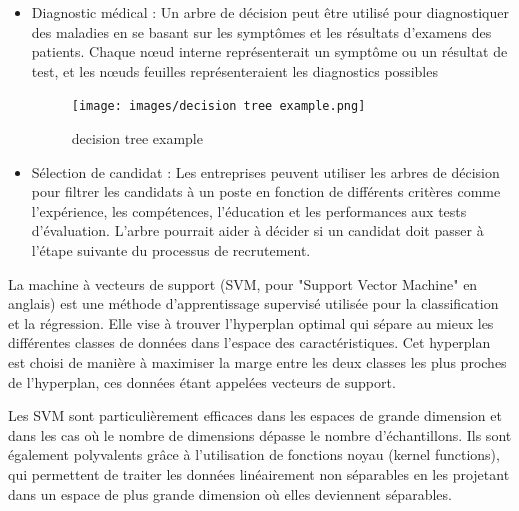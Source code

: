 \documentclass[a4paper,14pt]{article}
\begin{document}

            \begin{itemize}
                \item Diagnostic médical : Un arbre de décision peut être utilisé pour diagnostiquer des maladies en se basant sur les symptômes et les résultats d'examens des patients. Chaque nœud interne représenterait un symptôme ou un résultat de test, et les nœuds feuilles représenteraient les diagnostics possibles

                 \begin{figure}[h]
                    \centering
                    \texttt{[image: images/decision tree example.png]}
                    \caption{decision tree example}
                    \label{fig:decision tree example}
                \end{figure}
                \item Sélection de candidat : Les entreprises peuvent utiliser les arbres de décision pour filtrer les candidats à un poste en fonction de différents critères comme l'expérience, les compétences, l'éducation et les performances aux tests d'évaluation. L'arbre pourrait aider à décider si un candidat doit passer à l'étape suivante du processus de recrutement.
            \end{itemize}
            
        La machine à vecteurs de support (SVM, pour "Support Vector Machine" en anglais) est une méthode d'apprentissage supervisé utilisée pour la classification et la régression. Elle vise à trouver l'hyperplan optimal qui sépare au mieux les différentes classes de données dans l'espace des caractéristiques. Cet hyperplan est choisi de manière à maximiser la marge entre les deux classes les plus proches de l'hyperplan, ces données étant appelées vecteurs de support.
        
        Les SVM sont particulièrement efficaces dans les espaces de grande dimension et dans les cas où le nombre de dimensions dépasse le nombre d'échantillons. Ils sont également polyvalents grâce à l'utilisation de fonctions noyau (kernel functions), qui permettent de traiter les données linéairement non séparables en les projetant dans un espace de plus grande dimension où elles deviennent séparables.
        
        
\end{document}
